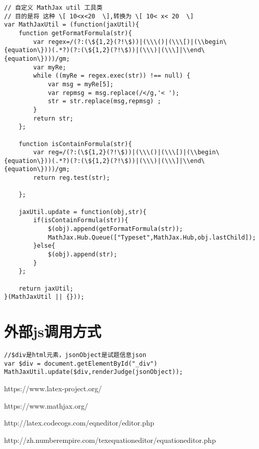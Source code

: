 \documentclass[UTF8]{ctexart}
\begin{document}
\begin{lstlisting}
// 自定义 MathJax util 工具类
// 目的是将 这种 \[ 10<x<20  \],转换为 \[ 10< x< 20  \]
var MathJaxUtil = (function(jaxUtil){
    function getFormatFormula(str){
        var regex=/(?:(\${1,2}(?!\$))|(\\\()|(\\\[)|(\\begin\{equation\}))(.*?)(?:(\${1,2}(?!\$))|(\\\)|(\\\]|\\end\{equation\})))/gm;
        var myRe;
        while ((myRe = regex.exec(str)) !== null) {
            var msg = myRe[5];
            var repmsg = msg.replace(/</g,'< ');
            str = str.replace(msg,repmsg) ;
        }
        return str;
    };

    function isContainFormula(str){
        var reg=/(?:(\${1,2}(?!\$))|(\\\()|(\\\[)|(\\begin\{equation\}))(.*?)(?:(\${1,2}(?!\$))|(\\\)|(\\\]|\\end\{equation\})))/gm;
        return reg.test(str);

    };

    jaxUtil.update = function(obj,str){
        if(isContainFormula(str)){
            $(obj).append(getFormatFormula(str));
            MathJax.Hub.Queue(["Typeset",MathJax.Hub,obj.lastChild]);
        }else{
            $(obj).append(str);
        }
    };

    return jaxUtil;
}(MathJaxUtil || {}));
\end{lstlisting}

\section{外部js调用方式}

\begin{lstlisting}
//$div是html元素，jsonObject是试题信息json
var $div = document.getElementById("_div")
MathJaxUtil.update($div,renderJudge(jsonObject));
\end{lstlisting}


\begin{thebibliography}{1}

\bibitem{}
\newblock https://www.latex-project.org/

\bibitem{}
\newblock https://www.mathjax.org/

\bibitem{}
\newblock http://latex.codecogs.com/eqneditor/editor.php

\bibitem{}
\newblock http://zh.numberempire.com/texequationeditor/equationeditor.php

\end{thebibliography}
\end{document}
